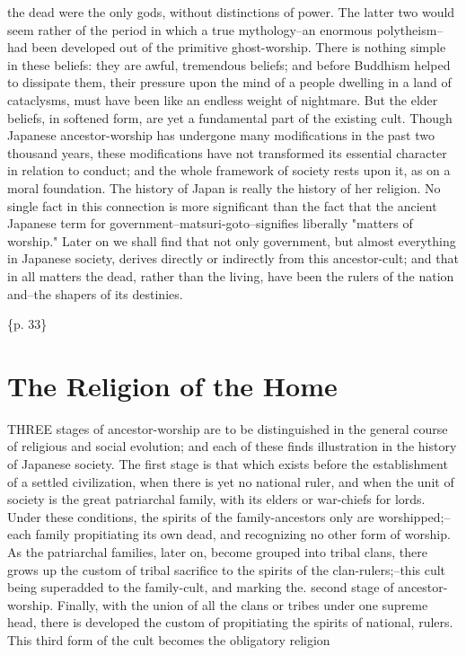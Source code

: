 the dead were the only gods, without distinctions of power. The latter two would seem rather of the period in which a true mythology--an enormous polytheism--had been developed out of the primitive ghost-worship. There is nothing simple in these beliefs: they are awful, tremendous beliefs; and before Buddhism helped to dissipate them, their pressure upon the mind of a people dwelling in a land of cataclysms, must have been like an endless weight of nightmare. But the elder beliefs, in softened form, are yet a fundamental part of the existing cult. Though Japanese ancestor-worship has undergone many modifications in the past two thousand years, these modifications have not transformed its essential character in relation to conduct; and the whole framework of society rests upon it, as on a moral foundation. The history of Japan is really the history of her religion. No single fact in this connection is more significant than the fact that the ancient Japanese term for government--matsuri-goto--signifies liberally "matters of worship." Later on we shall find that not only government, but almost everything in Japanese society, derives directly or indirectly from this ancestor-cult; and that in all matters the dead, rather than the living, have been the rulers of the nation and--the shapers of its destinies.

\{p. 33\}

\section{The Religion of the Home}
\label{sec:org251c959}

THREE stages of ancestor-worship are to be distinguished in the general course of religious and social evolution; and each of these finds illustration in the history of Japanese society. The first stage is that which exists before the establishment of a settled civilization, when there is yet no national ruler, and when the unit of society is the great patriarchal family, with its elders or war-chiefs for lords. Under these conditions, the spirits of the family-ancestors only are worshipped;--each family propitiating its own dead, and recognizing no other form of worship. As the patriarchal families, later on, become grouped into tribal clans, there grows up the custom of tribal sacrifice to the spirits of the clan-rulers;--this cult being superadded to the family-cult, and marking the. second stage of ancestor-worship. Finally, with the union of all the clans or tribes under one supreme head, there is developed the custom of propitiating the spirits of national, rulers. This third form of the cult becomes the obligatory religion

